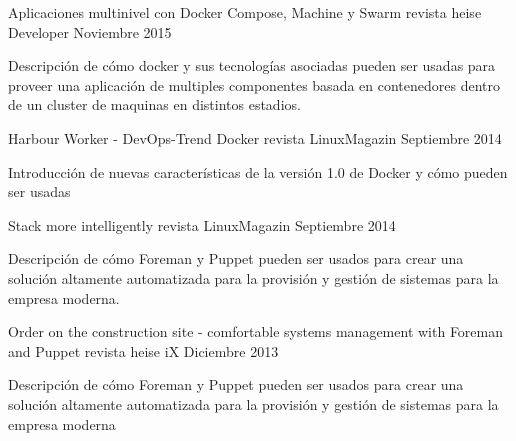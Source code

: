 {}


\begin{cvpublications}

  \cvpublication
    {Aplicaciones multinivel con Docker Compose, Machine y Swarm}
    {revista heise Developer} %
    {Noviembre 2015} %
    {
      \begin{cvparagraph} %
     Descripción de cómo docker y sus tecnologías asociadas pueden ser usadas para proveer una aplicación de multiples componentes basada en contenedores dentro de un cluster de maquinas en distintos estadios.
      \end{cvparagraph}
    }

  \cvpublication
    {Harbour Worker - DevOps-Trend Docker} %
    {revista LinuxMagazin} %
    {Septiembre 2014} %
    {
      \begin{cvparagraph} %
        Introducción de nuevas características de la versión 1.0 de Docker y cómo pueden ser usadas
      \end{cvparagraph}
    }
  \cvpublication
    {Stack more intelligently} %
    {revista LinuxMagazin} %
    {Septiembre 2014} %
    {
      \begin{cvparagraph} %
        Descripción de cómo Foreman y Puppet pueden ser usados para crear una solución altamente automatizada para la provisión y gestión de sistemas para la empresa moderna.
      \end{cvparagraph}
    }
  \cvpublication
    {Order on the construction site - \newline
      comfortable systems management with Foreman and Puppet} %
    {revista heise iX} %
    {Diciembre 2013} %
    {
      \begin{cvparagraph} %
        Descripción de cómo Foreman y Puppet pueden ser usados para crear una solución altamente automatizada para la provisión y gestión de sistemas para la empresa moderna
      \end{cvparagraph}
    }

\end{cvpublications}
